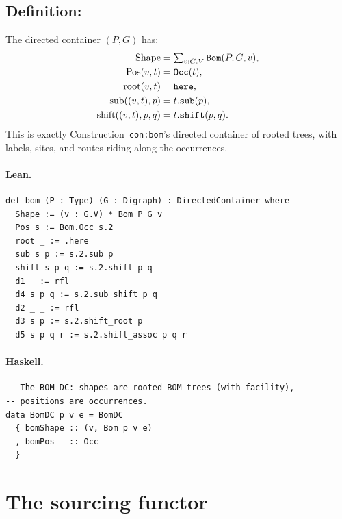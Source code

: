 \documentclass[11pt,a4paper]{article}
\begin{document}
\subsection{Definition: }

\begin{defn}
The directed container $(P, G)$ has:
\begin{align*}
  \mathrm{Shape} &= \textstyle\sum_{v : G.V} \texttt{Bom}(P, G, v), \\
  \mathrm{Pos}(v, t) &= \texttt{Occ}(t), \\
  \mathrm{root}(v, t) &= \texttt{here}, \\
  \mathrm{sub}((v, t), p) &= t.\texttt{sub}(p), \\
  \mathrm{shift}((v, t), p, q) &= t.\texttt{shift}(p, q).
\end{align*}
This is exactly Construction~\texttt{con:bom}'s directed container of rooted
trees, with labels, sites, and routes riding along the occurrences.
\end{defn}

\paragraph{Lean.}
\begin{lstlisting}[style=lean]
def bom (P : Type) (G : Digraph) : DirectedContainer where
  Shape := (v : G.V) * Bom P G v
  Pos s := Bom.Occ s.2
  root _ := .here
  sub s p := s.2.sub p
  shift s p q := s.2.shift p q
  d1 _ := rfl
  d4 s p q := s.2.sub_shift p q
  d2 _ _ := rfl
  d3 s p := s.2.shift_root p
  d5 s p q r := s.2.shift_assoc p q r
\end{lstlisting}

\paragraph{Haskell.}
\begin{lstlisting}[style=haskell]
-- The BOM DC: shapes are rooted BOM trees (with facility),
-- positions are occurrences.
data BomDC p v e = BomDC
  { bomShape :: (v, Bom p v e)
  , bomPos   :: Occ
  }
\end{lstlisting}


\section{The sourcing functor}
\end{document}
